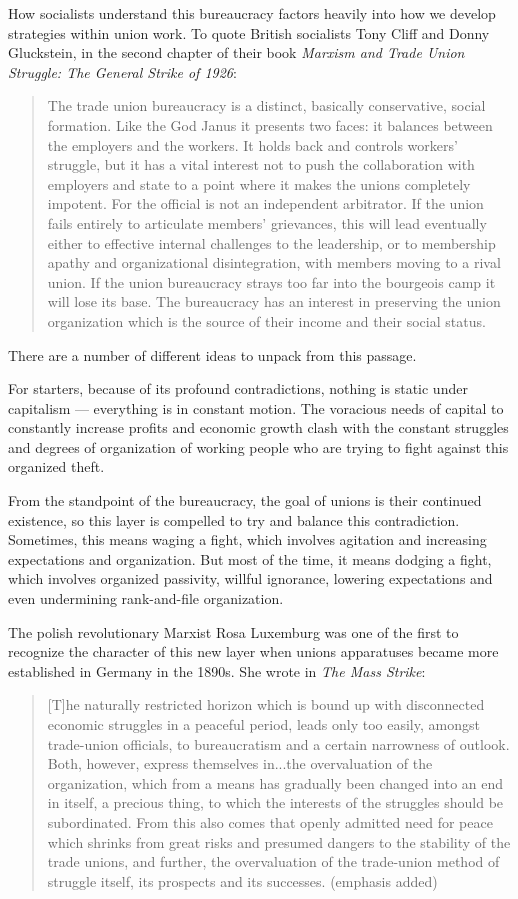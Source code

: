 How socialists understand this bureaucracy factors heavily into how we develop strategies within union work. To quote British socialists Tony Cliff and Donny Gluckstein, in the second chapter of their book \emph{Marxism and Trade Union Struggle: The General Strike of 1926}:

\blockquote{
The trade union bureaucracy is a distinct, basically conservative, social formation. Like the God Janus it presents two faces: it balances between the employers and the workers. It holds back and controls workers’ struggle, but it has a vital interest not to push the collaboration with employers and state to a point where it makes the unions completely impotent. For the official is not an independent arbitrator. If the union fails entirely to articulate members’ grievances, this will lead eventually either to effective internal challenges to the leadership, or to membership apathy and organizational disintegration, with members moving to a rival union. If the union bureaucracy strays too far into the bourgeois camp it will lose its base. The bureaucracy has an interest in preserving the union organization which is the source of their income and their social status. 
}

There are a number of different ideas to unpack from this passage.

For starters, because of its profound contradictions, nothing is static under capitalism — everything is in constant motion. The voracious needs of capital to constantly increase profits and economic growth clash with the constant struggles and degrees of organization of working people who are trying to fight against this organized theft.

From the standpoint of the bureaucracy, the goal of unions is their continued existence, so this layer is compelled to try and balance this contradiction. Sometimes, this means waging a fight, which involves agitation and increasing expectations and organization. But most of the time, it means dodging a fight, which involves organized passivity, willful ignorance, lowering expectations and even undermining rank-and-file organization.

\sectiondivider

The polish revolutionary Marxist Rosa Luxemburg was one of the first to recognize the character of this new layer when unions apparatuses became more established in Germany in the 1890s. She wrote in \emph{The Mass Strike}:

\blockquote{
[T]he naturally restricted horizon which is bound up with disconnected economic struggles in a peaceful period, leads only too easily, amongst trade-union officials, to bureaucratism and a certain narrowness of outlook. Both, however, express themselves in...the overvaluation of the organization, which from a means has gradually been changed into an end in itself, a precious thing, to which the interests of the struggles should be subordinated. From this also comes that openly admitted need for peace which shrinks from great risks and presumed dangers to the stability of the trade unions, and further, the overvaluation of the trade-union method of struggle itself, its prospects and its successes. (emphasis added)
}

